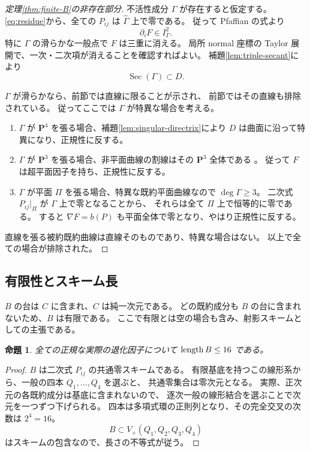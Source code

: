 \documentclass[11pt,a4paper]{ltjsarticle}
\newcommand{\PP}{\mathbf P}\renewcommand{\AA}{\mathbf A}
\newtheorem{proposition}[theorem]{命題}
\theoremstyle{remark}\newtheorem{remark}[theorem]{注意}
\begin{document}
\begin{proof}[定理\ref{thm:finite-B}の非存在部分]
不活性成分 $\Gamma$ が存在すると仮定する。
\eqref{eq:residue}から、全ての $P_{ij}$ は $\widehat\Gamma$ 上で零である。
従って Pfaffian の式より
\[
\partial_iF\in I_\Gamma^2.
\]
特に $\Gamma$ の滑らかな一般点で $F$ は三重に消える。
局所 normal 座標の Taylor 展開で、一次・二次項が消えることを確認すればよい。
補題\ref{lem:triple-secant}により
\[
\operatorname{Sec}(\Gamma)\subset D.
\]

$\Gamma$ が滑らかなら、前節では直線に限ることが示され、
前節ではその直線も排除されている。
従ってここでは $\Gamma$ が特異な場合を考える。
\begin{enumerate}
\item $\Gamma$ が $\PP^4$ を張る場合、補題\ref{lem:singular-directrix}により
$D$ は曲面に沿って特異になり、正規性に反する。
\item $\Gamma$ が $\PP^3$ を張る場合、非平面曲線の割線はその $\PP^3$ 全体である
\cite[Proposition 2.5 の直前]{AMSSecant}。
従って $F$ は超平面因子を持ち、正規性に反する。
\item $\Gamma$ が平面 $\Pi$ を張る場合、特異な既約平面曲線なので $\deg\Gamma\ge3$。
二次式 $P_{ij}|_\Pi$ が $\Gamma$ 上で零となることから、
それらは全て $\Pi$ 上で恒等的に零である。
すると $\nabla F=b(P)$ も平面全体で零となり、やはり正規性に反する。
\end{enumerate}
直線を張る被約既約曲線は直線そのものであり、特異な場合はない。
以上で全ての場合が排除された。
\end{proof}

\subsection{有限性とスキーム長}

$B$ の台は $C$ に含まれ、$C$ は純一次元である。
どの既約成分も $B$ の台に含まれないため、$B$ は有限である。
ここで有限とは空の場合も含み、射影スキームとしての主張である。

\begin{proposition}\label{prop:lengthB}
全ての正規な実際の退化因子について $\operatorname{length} B\le16$ である。
\end{proposition}
\begin{proof}
$B$ は二次式 $P_{ij}$ の共通零スキームである。
有限基底を持つこの線形系から、一般の四本 $Q_1,\ldots,Q_4$ を選ぶと、
共通零集合は零次元となる。
実際、正次元の各既約成分は基底に含まれないので、
逐次一般の線形結合を選ぶことで次元を一つずつ下げられる。
四本は多項式環の正則列となり、その完全交叉の次数は $2^4=16$。
\[
B\subset V_+(Q_1,Q_2,Q_3,Q_4)
\]
はスキームの包含なので、長さの不等式が従う。
\end{proof}
\end{document}
